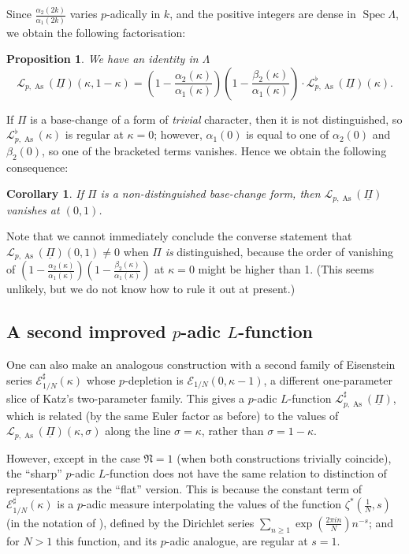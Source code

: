 \documentclass[a4paper,10pt]{amsart}
\theoremstyle{plain}
\newtheorem{proposition}[theorem]{Proposition}
\newtheorem{corollary}[theorem]{Corollary}
\theoremstyle{remark}
\DeclareMathOperator{\Spec}{Spec}
\DeclareMathOperator{\As}{As}
\newcommand{\fN}{\mathfrak{N}}
\newcommand{\cE}{\mathcal{E}}
\newcommand{\cL}{\mathcal{L}}
\newcommand{\uPi}{\underline{\Pi}}
\numberwithin{equation}{section}
\renewcommand{\ge}{\geqslant}
\begin{document}
  Since $\frac{\alpha_2(2k)}{\alpha_1(2k)}$ varies $p$-adically in $k$, and the positive integers are dense in $\Spec \Lambda$, we obtain the following factorisation:

  \begin{proposition}
   \label{prop:factorisation}
   We have an identity in $\Lambda$
   \[
    \cL_{p,\As}(\uPi)(\kappa, 1 - \kappa)=\left(1-\frac{\alpha_2(\kappa)}{\alpha_1(\kappa)}\right) \left(1-\frac{\beta_2(\kappa)}{\alpha_1(\kappa)}\right)\cdot \cL^\flat_{p,\As}(\uPi)(\kappa).
   \]
  \end{proposition}

  If $\Pi$ is a base-change of a form of \emph{trivial} character, then it is not distinguished, so $\cL^\flat_{p,\As}(\kappa)$ is regular at $\kappa = 0$; however, $\alpha_1(0)$ is equal to one of $\alpha_2(0)$ and $\beta_2(0)$, so one of the bracketed terms vanishes. Hence we obtain the following consequence:

  \begin{corollary}
   If $\Pi$ is a non-distinguished base-change form, then $\cL_{p,\As}(\uPi)$ vanishes at $(0, 1)$.
  \end{corollary}

  Note that we cannot immediately conclude the converse statement that $\cL_{p,\As}(\uPi)(0,1) \ne 0$ when $\Pi$ \emph{is} distinguished, because the order of vanishing of $\left(1-\frac{\alpha_2(\kappa)}{\alpha_1(\kappa)}\right) \left(1-\frac{\beta_2(\kappa)}{\alpha_1(\kappa)}\right)$ at $\kappa = 0$ might be higher than 1. (This seems unlikely, but we do not know how to rule it out at present.)

 \subsection{A second improved $p$-adic $L$-function}

  One can also make an analogous construction with a second family of Eisenstein series $\cE^{\sharp}_{1/N}(\kappa)$ whose $p$-depletion is $\cE_{1/N}(0, \kappa-1)$, a different one-parameter slice of Katz's two-parameter family. This gives a $p$-adic $L$-function $\cL^\sharp_{p,\As}(\uPi)$, which is related (by the same Euler factor as before) to the values of $\cL_{p,\As}(\uPi)(\kappa, \sigma)$ along the line $\sigma = \kappa$, rather than $\sigma = 1-\kappa$.

  However, except in the case $\fN = 1$ (when both constructions trivially coincide), the ``sharp'' $p$-adic $L$-function does not have the same relation to distinction of representations as the ``flat'' version. This is because the constant term of $\cE^{\sharp}_{1/N}(\kappa)$ is a $p$-adic measure interpolating the values of the function $\zeta^*(\tfrac{1}{N}, s)$ (in the notation of \cite[\S 3]{kato04}), defined by the Dirichlet series $\sum_{n \ge 1} \exp\left(\tfrac{2\pi i n}{N}\right) n^{-s}$; and for $N > 1$ this function, and its $p$-adic analogue, are regular at $s = 1$.
\end{document}
